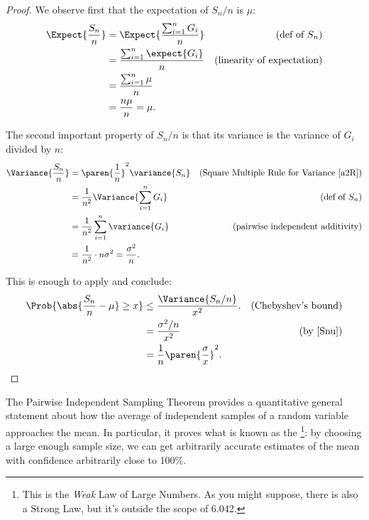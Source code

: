 \begin{proof}
We observe first that the expectation of $S_n/n$ is $\mu$:
\begin{align*}
\Expect{\frac{S_n}{n}} & = \Expect{\frac{\sum_{i=1}^n G_i}{n}}
         & \text{(def of $S_n$)}\\
 & = \frac{\sum_{i=1}^n \expect{G_i}}{n} 
     & \text{(linearity of expectation)}\\
 & = \frac{\sum_{i=1}^n \mu}{n}\\
 & = \frac{n\mu}{n} = \mu.
\end{align*}

The second important property of $S_n/n$ is that its variance is the
variance of $G_i$ divided by $n$:
\begin{align}
\Variance{\frac{S_n}{n}} & =  \paren{\frac{1}{n}}^2 \variance{S_n}
          & \mbox{(Square Multiple Rule for Variance~\eqref{a2R})}\notag\\
 & =  \frac{1}{n^2} \Variance{\sum_{i=1}^n G_i} 
          & \text{(def of $S_n$)}\notag\\
 & =  \frac{1}{n^2} \sum_{i=1}^n \variance{G_i}
        & \text{(pairwise independent additivity)}\notag\\
 & =  \frac{1}{n^2}\cdot n\sigma^2 =  \frac{\sigma^2}{n}.\label{Snu}
\end{align}

This is enough to apply  and conclude:
\begin{align*}
\Prob{\abs{\frac{S_n}{n} - \mu} \geq x} & \leq \frac{\Variance{S_n/n}}{x^2}.
       & \text{(Chebyshev's bound)}\\
    & = \frac{\sigma^2/n}{x^2} & \text{(by~\eqref{Snu})}\\
    & = \frac{1}{n} \paren{\frac{\sigma}{x}}^2.
\end{align*}

\end{proof}

The Pairwise Independent Sampling Theorem provides a quantitative
general statement about how the average of independent samples of a
random variable approaches the mean.  In particular, it proves what is
known as the \footnote{This is the
   \emph{Weak} Law of Large Numbers.
  As you might suppose, there is also a Strong Law, but it's outside
  the scope of 6.042.}: by choosing a large enough sample size, we can
get arbitrarily accurate estimates of the mean with confidence
arbitrarily close to 100\%.

